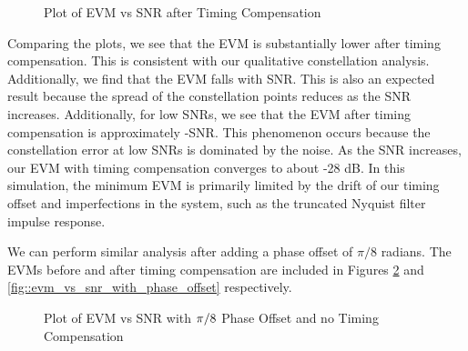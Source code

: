 \documentclass{article}
\begin{document}
\begin{figure}[H]
	\centerline{}
	\caption{Plot of EVM vs SNR after Timing Compensation}
	\label{fig::evm_vs_snr}
\end{figure}

Comparing the plots, we see that the EVM is substantially lower after timing compensation. This is consistent with our qualitative constellation analysis. Additionally, we find that the EVM falls with SNR. This is also an expected result because the spread of the constellation points reduces as the SNR increases. Additionally, for low SNRs, we see that the EVM after timing compensation is approximately -SNR. This phenomenon occurs because the constellation error at low SNRs is dominated by the noise. As the SNR increases, our EVM with timing compensation converges to about -28 dB. In this simulation, the minimum EVM is primarily limited by the drift of our timing offset and imperfections in the system, such as the truncated Nyquist filter impulse response.

	We can perform similar analysis after adding a phase offset of $\pi/8$ radians. The EVMs before and after timing compensation are included in Figures \ref{fig::evm_vs_snr_with_phase_offset_no_comp} and \ref{fig::evm_vs_snr_with_phase_offset} respectively.

\begin{figure}[H]
	\centerline{}
	\caption{Plot of EVM vs SNR with $\protect\pi/8$ Phase Offset and no Timing Compensation}
	\label{fig::evm_vs_snr_with_phase_offset_no_comp}
\end{figure}
\end{document}
